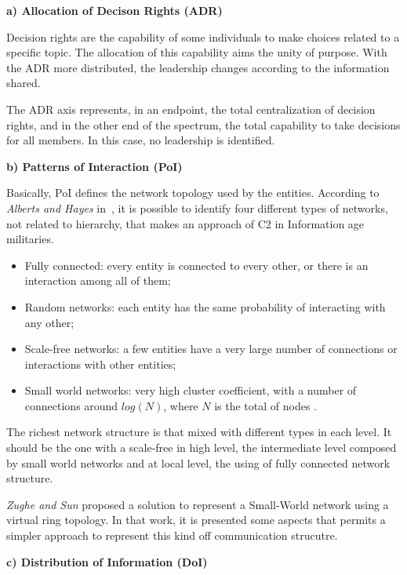 %

\textbf{a) Allocation of Decison Rights (ADR)}

Decision rights are the capability of some individuals to make choices related to a specific topic. The allocation of this capability aims the unity of purpose. With the ADR more distributed, the leadership changes according to the information shared.

The ADR axis represents, in an endpoint, the total centralization of decision rights, and in the other end of the spectrum, the total capability to take decisions for all members. In this case, no leadership is identified.

\textbf{b) Patterns of Interaction (PoI)}

Basically, PoI defines the network topology used by the entities. According to \textit{Alberts and Hayes} in~\cite{Alberts2006}, it is possible to identify four different types of networks, not related to hierarchy, that makes an approach of C2 in Information age militaries.

\begin{itemize}
    \item Fully connected: every entity is connected to every other, or there is an interaction among all of them;
    \item Random networks: each entity has the same probability of interacting with any other;
    \item Scale-free networks: a few entities have a very large number of connections or interactions with other entities;
    \item Small world networks: very high cluster coefficient, with a number of connections around $log(N)$, where $N$ is the total of nodes \cite{small01}.
\end{itemize}
 
The richest network structure is that mixed with different types in each level\cite{Alberts2006}. It should be the one with a scale-free in high level, the intermediate level composed by small world networks and at local level, the using of fully connected network structure.

\textit{Zughe and Sun} \cite{small02} proposed a solution to represent a Small-World network using a virtual ring topology. In that work, it is presented some aspects that permits a simpler approach to represent this kind off communication strucutre.

\textbf{c) Distribution of Information (DoI)}

